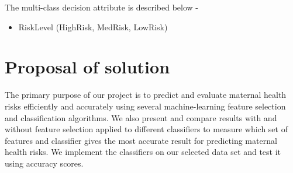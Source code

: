\documentclass[conference]{IEEEtran}
\begin{document}
The multi-class decision attribute is described below -
\begin{itemize}
    \item RiskLevel (HighRisk, MedRisk, LowRisk)
\end{itemize}
\section{Proposal of solution}

The primary purpose of our project is to predict and evaluate maternal health risks efficiently and accurately using several machine-learning feature selection and classification algorithms. We also present and compare results with and without feature selection applied to different classifiers to measure which set of features and classifier gives the most accurate result for predicting maternal health risks. We implement the classifiers on our selected data set and test it using accuracy scores.
\end{document}
